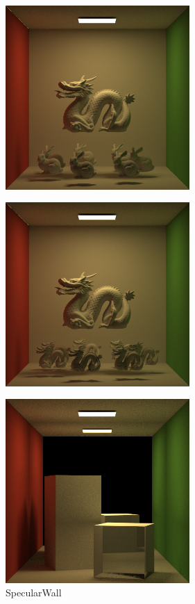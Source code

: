 \documentclass[acmtog]{acmart}
\begin{document}
\begin{figure}[h]
	\centering
	\includegraphics[width=7cm,height=7cm]{output3.png}
\end{figure}
\begin{figure}[h]
	\centering
	\includegraphics[width=7cm,height=7cm]{output4.png}
\end{figure}
\begin{figure}[h]
	\centering
	\includegraphics[width=7cm,height=7cm]{spec.PNG}
	\caption{SpecularWall}
\end{figure}
\end{document}
